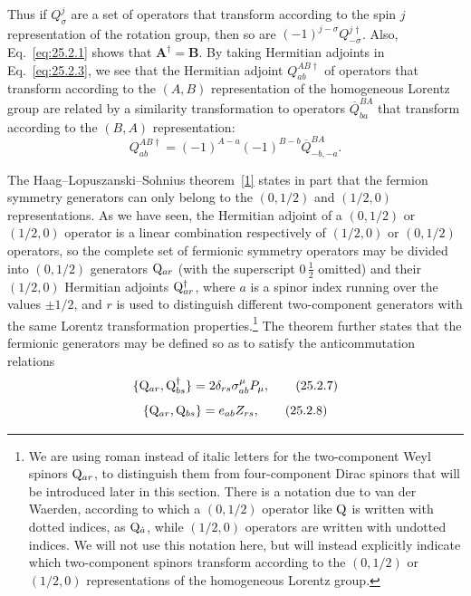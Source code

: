 Thus if \(Q_\sigma^j\) are a set of operators that transform according to
the spin \(j\) representation of the rotation group, then so are
\((-1)^{j-\sigma}Q_{-\sigma}^{j\dagger}\). Also,
Eq.~\eqref{eq:25.2.1} shows that
\(\mathbf A^\dagger=\mathbf B\). By taking Hermitian adjoints in
Eq.~\eqref{eq:25.2.3}, we see that the Hermitian adjoint
\(Q_{ab}^{AB\dagger}\) of operators that transform according to the \((A,B)\)
representation of the homogeneous Lorentz group are related by a similarity
transformation to operators \(\overline Q_{ba}^{BA}\) that transform
according to the \((B,A)\) representation:
\begin{equation}
Q_{ab}^{AB\dagger}
=(-1)^{A-a}(-1)^{B-b}\overline Q_{-b,-a}^{BA}.
\tag{25.2.6}\label{eq:25.2.6}
\end{equation}

The Haag--Lopuszanski--Sohnius theorem~\hyperref[ch25-ref-1]{[1]} states in
part that the fermion symmetry generators can only belong to the
\((0,1/2)\) and \((1/2,0)\) representations. As we have seen, the Hermitian
adjoint of a \((0,1/2)\) or \((1/2,0)\) operator is a linear combination
respectively of \((1/2,0)\) or \((0,1/2)\) operators, so the complete set
of fermionic symmetry operators may be divided into \((0,1/2)\) generators
\(\mathrm{Q}_{ar}\) (with the superscript \(0\,\frac12\) omitted) and their
\((1/2,0)\) Hermitian adjoints \(\mathrm{Q}_{ar}^\dagger\), where \(a\) is a
spinor
index running over the values \(\pm1/2\), and \(r\) is used to distinguish
different two-component generators with the same Lorentz transformation
properties.\footnote{We are using roman instead of italic letters for the
two-component Weyl spinors \(\mathrm{Q}_{ar}\), to distinguish them from
four-component Dirac spinors that will be introduced later in this section.
There is a notation due to van der Waerden, according to which a
\((0,1/2)\) operator like \(\mathrm{Q}\) is written with dotted indices, as
\(\mathrm{Q}_{\dot a}\), while \((1/2,0)\) operators are written with undotted
indices. We will not use this notation here, but will instead explicitly
indicate which two-component spinors transform according to the \((0,1/2)\)
or \((1/2,0)\) representations of the homogeneous Lorentz group.} The
theorem further states that the fermionic generators may be defined so as
to satisfy the anticommutation relations
\begin{equation}
\{\mathrm{Q}_{ar},\mathrm{Q}_{bs}^\dagger\}
=2\delta_{rs}\sigma^\mu_{ab}P_\mu,
\tag{25.2.7}\label{eq:25.2.7}
\end{equation}
\begin{equation}
\{\mathrm{Q}_{ar},\mathrm{Q}_{bs}\}=e_{ab}Z_{rs},
\tag{25.2.8}\label{eq:25.2.8}
\end{equation}
